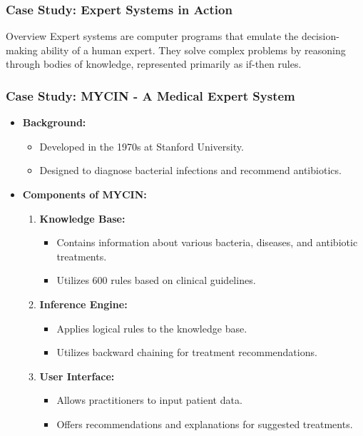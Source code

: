 \documentclass[aspectratio=169]{beamer}
\begin{document}
\begin{frame}[fragile]
    \frametitle{Case Study: Expert Systems in Action}
    \begin{block}{Overview}
        Expert systems are computer programs that emulate the decision-making ability of a human expert. They solve complex problems by reasoning through bodies of knowledge, represented primarily as if-then rules. 
    \end{block}
\end{frame}

\begin{frame}[fragile]
    \frametitle{Case Study: MYCIN - A Medical Expert System}
    \begin{itemize}
        \item \textbf{Background:}
        \begin{itemize}
            \item Developed in the 1970s at Stanford University.
            \item Designed to diagnose bacterial infections and recommend antibiotics.
        \end{itemize}
        
        \item \textbf{Components of MYCIN:}
        \begin{enumerate}
            \item \textbf{Knowledge Base:}
            \begin{itemize}
                \item Contains information about various bacteria, diseases, and antibiotic treatments.
                \item Utilizes 600 rules based on clinical guidelines.
            \end{itemize}
            \item \textbf{Inference Engine:}
            \begin{itemize}
                \item Applies logical rules to the knowledge base.
                \item Utilizes backward chaining for treatment recommendations.
            \end{itemize}
            \item \textbf{User Interface:}
            \begin{itemize}
                \item Allows practitioners to input patient data.
                \item Offers recommendations and explanations for suggested treatments.
            \end{itemize}
        \end{enumerate}
    \end{itemize}
\end{frame}
\end{document}
